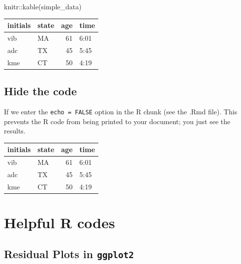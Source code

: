 \documentclass[
]{book}
\newenvironment{Shaded}{\begin{snugshade}}{\end{snugshade}}
\newcommand{\FunctionTok}[1]{\textcolor[rgb]{0.00,0.00,0.00}{#1}}
\newcommand{\NormalTok}[1]{#1}
\newcommand{\SpecialCharTok}[1]{\textcolor[rgb]{0.00,0.00,0.00}{#1}}
\begin{document}
\begin{Shaded}
\begin{Highlighting}[]
\NormalTok{knitr}\SpecialCharTok{::}\FunctionTok{kable}\NormalTok{(simple\_data)}
\end{Highlighting}
\end{Shaded}

\begin{tabular}{l|l|r|l}
\hline
initials & state & age & time\\
\hline
vib & MA & 61 & 6:01\\
\hline
adc & TX & 45 & 5:45\\
\hline
kme & CT & 50 & 4:19\\
\hline
\end{tabular}

\hypertarget{hide-the-code}{%
\section{Hide the code}\label{hide-the-code}}

If we enter the \texttt{echo\ =\ FALSE} option in the R chunk (see the .Rmd file). This prevents the R code from being printed to your document; you just see the results.

\begin{tabular}{l|l|r|l}
\hline
initials & state & age & time\\
\hline
vib & MA & 61 & 6:01\\
\hline
adc & TX & 45 & 5:45\\
\hline
kme & CT & 50 & 4:19\\
\hline
\end{tabular}

\hypertarget{helpful-r-codes}{%
\chapter{Helpful R codes}\label{helpful-r-codes}}

\hypertarget{residual-plots-in-ggplot2}{%
\section{\texorpdfstring{Residual Plots in \texttt{ggplot2}}{Residual Plots in ggplot2}}\label{residual-plots-in-ggplot2}}
\end{document}
